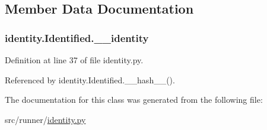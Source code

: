 \subsection{Member Data Documentation}
\hypertarget{classidentity_1_1Identified_a66c7fac21a97889bb0584a69cd6dd4e2}{}
\subsubsection[{\+\_\+\+\_\+identity}]{\setlength{\rightskip}{0pt plus 5cm}identity.\+Identified.\+\_\+\+\_\+identity\hspace{0.3cm}{\ttfamily [private]}}\label{classidentity_1_1Identified_a66c7fac21a97889bb0584a69cd6dd4e2}


Definition at line 37 of file identity.\+py.



Referenced by identity.\+Identified.\+\_\+\+\_\+hash\+\_\+\+\_\+().



The documentation for this class was generated from the following file\+:\begin{DoxyCompactItemize}
\item 
src/runner/\hyperlink{identity_8py}{identity.\+py}\end{DoxyCompactItemize}
